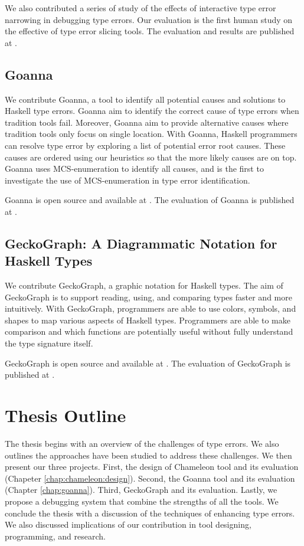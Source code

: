 We also contributed a series of study of the effects of interactive type error narrowing in debugging type errors.  Our evaluation is the first human study on the effective of type error slicing tools. The evaluation and results are published at \cite{Anonymous2022-xp}.
  
\subsection{Goanna}
We contribute Goanna, a tool to identify all potential causes and solutions to Haskell type errors. Goanna aim to identify the correct cause of type errors when tradition tools fail. Moreover, Goanna aim to provide alternative causes where tradition tools only focus on single location. With Goanna, Haskell programmers can resolve type error by exploring a list of potential error root causes. These causes are ordered using our heuristics so that the more likely causes are on top. Goanna uses MCS-enumeration to identify all causes, and is the first to investigate the use of MCS-enumeration in type error identification.


 Goanna is open source and available at \cite{}. The evaluation of Goanna is published at \cite{}.

\subsection{GeckoGraph: A Diagrammatic Notation for Haskell Types}
We contribute GeckoGraph, a graphic notation for Haskell types. The aim of GeckoGraph is to support reading, using, and comparing types faster and more intuitively. With GeckoGraph, programmers are able to use colors, symbols, and shapes to map various aspects of Haskell types. Programmers are able to make comparison and which functions are potentially useful without fully understand the type signature itself. 


  GeckoGraph is open source and available at \cite{}. The evaluation of GeckoGraph is published at \cite{}.

\section{Thesis Outline}

The thesis begins with an overview of the challenges of type errors. We also outlines the approaches have been studied to address these challenges. We then present our three projects. First, the design of Chameleon tool and its evaluation (Chapeter \ref{chap:chameleon:design}). Second, the Goanna tool and its evaluation (Chapter \ref{chap:goanna}). Third, GeckoGraph and its evaluation. Lastly, we propose a debugging system that combine the strengths of all the tools. We conclude the thesis with a discussion of the techniques of enhancing type errors. We also discussed implications of our contribution in tool designing, programming, and research. 